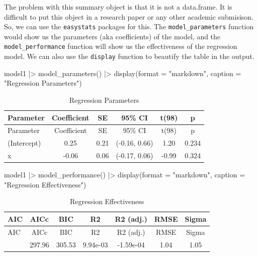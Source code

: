 \documentclass[
  letterpaper,
  twoside,
  openright,
  headsepline,
  footsepline,
  listof = totocnumbered,
  chapterprefix = true,
  titlepage = false]{scrbook}
\newenvironment{Shaded}{\begin{snugshade}}{\end{snugshade}}
\newcommand{\AttributeTok}[1]{\textcolor[rgb]{0.40,0.45,0.13}{#1}}
\newcommand{\FunctionTok}[1]{\textcolor[rgb]{0.28,0.35,0.67}{#1}}
\newcommand{\NormalTok}[1]{\textcolor[rgb]{0.00,0.23,0.31}{#1}}
\newcommand{\SpecialCharTok}[1]{\textcolor[rgb]{0.37,0.37,0.37}{#1}}
\newcommand{\StringTok}[1]{\textcolor[rgb]{0.13,0.47,0.30}{#1}}
\begin{document}
The problem with this summary object is that it is not a data.frame. It
is difficult to put this object in a research paper or any other
academic submisison. So, we can use the \texttt{easystats} packages for
this. The \texttt{model\_parameters} function would show us the
parameters (aka coefficients) of the model, and the
\texttt{model\_performance} function will show us the effectiveness of
the regression model. We can also use the \texttt{display} function to
beautify the table in the output.

\begin{Shaded}
\begin{Highlighting}[numbers=left,,]
\NormalTok{model1 }\SpecialCharTok{|\textgreater{}} \FunctionTok{model\_parameters}\NormalTok{() }\SpecialCharTok{|\textgreater{}} 
  \FunctionTok{display}\NormalTok{(}\AttributeTok{format =} \StringTok{"markdown"}\NormalTok{, }\AttributeTok{caption =} \StringTok{"Regression Parameters"}\NormalTok{)}
\end{Highlighting}
\end{Shaded}

\hypertarget{tbl-regression-params}{}
\begin{longtable}[]{@{}lccccc@{}}
\caption{\label{tbl-regression-params}Regression
Parameters}\tabularnewline
\toprule\noalign{}
Parameter & Coefficient & SE & 95\% CI & t(98) & p \\
\midrule\noalign{}
\endfirsthead
\toprule\noalign{}
Parameter & Coefficient & SE & 95\% CI & t(98) & p \\
\midrule\noalign{}
\endhead
\bottomrule\noalign{}
\endlastfoot
(Intercept) & 0.25 & 0.21 & (-0.16, 0.66) & 1.20 & 0.234 \\
x & -0.06 & 0.06 & (-0.17, 0.06) & -0.99 & 0.324 \\
\end{longtable}

\begin{Shaded}
\begin{Highlighting}[numbers=left,,]
\NormalTok{model1 }\SpecialCharTok{|\textgreater{}} \FunctionTok{model\_performance}\NormalTok{() }\SpecialCharTok{|\textgreater{}} 
  \FunctionTok{display}\NormalTok{(}\AttributeTok{format =} \StringTok{"markdown"}\NormalTok{, }\AttributeTok{caption =} \StringTok{"Regression Effectiveness"}\NormalTok{)}
\end{Highlighting}
\end{Shaded}

\hypertarget{tbl-regression-effectiveness}{}
\begin{longtable}[]{@{}lcccccc@{}}
\caption{\label{tbl-regression-effectiveness}Regression
Effectiveness}\tabularnewline
\toprule\noalign{}
AIC & AICc & BIC & R2 & R2 (adj.) & RMSE & Sigma \\
\midrule\noalign{}
\endfirsthead
\toprule\noalign{}
AIC & AICc & BIC & R2 & R2 (adj.) & RMSE & Sigma \\
\midrule\noalign{}
\endhead
\bottomrule\noalign{}
\endlastfoot
297.71 & 297.96 & 305.53 & 9.94e-03 & -1.59e-04 & 1.04 & 1.05 \\
\end{longtable}
\end{document}
